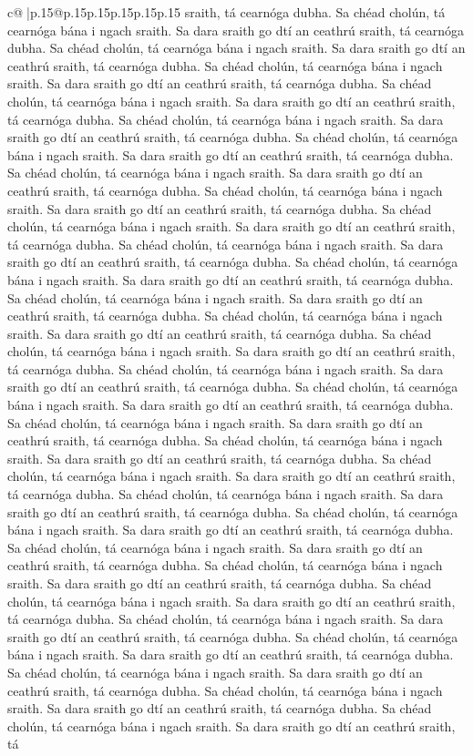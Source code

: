 \documentclass{article}
\begin{document}
{\begin{supertabular}{c@{$\;$}|p{.15\linewidth}@{}p{.15\linewidth}p{.15\linewidth}p{.15\linewidth}p{.15\linewidth}p{.15\linewidth}}
{{{sraith, tá cearnóga dubha. Sa chéad cholún, tá cearnóga bána i ngach sraith. Sa dara sraith go dtí an ceathrú sraith, tá cearnóga dubha. Sa chéad cholún, tá cearnóga bána i ngach sraith. Sa dara sraith go dtí an ceathrú sraith, tá cearnóga dubha. Sa chéad cholún, tá cearnóga bána i ngach sraith. Sa dara sraith go dtí an ceathrú sraith, tá cearnóga dubha. Sa chéad cholún, tá cearnóga bána i ngach sraith. Sa dara sraith go dtí an ceathrú sraith, tá cearnóga dubha. Sa chéad cholún, tá cearnóga bána i ngach sraith. Sa dara sraith go dtí an ceathrú sraith, tá cearnóga dubha. Sa chéad cholún, tá cearnóga bána i ngach sraith. Sa dara sraith go dtí an ceathrú sraith, tá cearnóga dubha. Sa chéad cholún, tá cearnóga bána i ngach sraith. Sa dara sraith go dtí an ceathrú sraith, tá cearnóga dubha. Sa chéad cholún, tá cearnóga bána i ngach sraith. Sa dara sraith go dtí an ceathrú sraith, tá cearnóga dubha. Sa chéad cholún, tá cearnóga bána i ngach sraith. Sa dara sraith go dtí an ceathrú sraith, tá cearnóga dubha. Sa chéad cholún, tá cearnóga bána i ngach sraith. Sa dara sraith go dtí an ceathrú sraith, tá cearnóga dubha. Sa chéad cholún, tá cearnóga bána i ngach sraith. Sa dara sraith go dtí an ceathrú sraith, tá cearnóga dubha. Sa chéad cholún, tá cearnóga bána i ngach sraith. Sa dara sraith go dtí an ceathrú sraith, tá cearnóga dubha. Sa chéad cholún, tá cearnóga bána i ngach sraith. Sa dara sraith go dtí an ceathrú sraith, tá cearnóga dubha. Sa chéad cholún, tá cearnóga bána i ngach sraith. Sa dara sraith go dtí an ceathrú sraith, tá cearnóga dubha. Sa chéad cholún, tá cearnóga bána i ngach sraith. Sa dara sraith go dtí an ceathrú sraith, tá cearnóga dubha. Sa chéad cholún, tá cearnóga bána i ngach sraith. Sa dara sraith go dtí an ceathrú sraith, tá cearnóga dubha. Sa chéad cholún, tá cearnóga bána i ngach sraith. Sa dara sraith go dtí an ceathrú sraith, tá cearnóga dubha. Sa chéad cholún, tá cearnóga bána i ngach sraith. Sa dara sraith go dtí an ceathrú sraith, tá cearnóga dubha. Sa chéad cholún, tá cearnóga bána i ngach sraith. Sa dara sraith go dtí an ceathrú sraith, tá cearnóga dubha. Sa chéad cholún, tá cearnóga bána i ngach sraith. Sa dara sraith go dtí an ceathrú sraith, tá cearnóga dubha. Sa chéad cholún, tá cearnóga bána i ngach sraith. Sa dara sraith go dtí an ceathrú sraith, tá cearnóga dubha. Sa chéad cholún, tá cearnóga bána i ngach sraith. Sa dara sraith go dtí an ceathrú sraith, tá cearnóga dubha. Sa chéad cholún, tá cearnóga bána i ngach sraith. Sa dara sraith go dtí an ceathrú sraith, tá cearnóga dubha. Sa chéad cholún, tá cearnóga bána i ngach sraith. Sa dara sraith go dtí an ceathrú sraith, tá cearnóga dubha. Sa chéad cholún, tá cearnóga bána i ngach sraith. Sa dara sraith go dtí an ceathrú sraith, tá cearnóga dubha. Sa chéad cholún, tá cearnóga bána i ngach sraith. Sa dara sraith go dtí an ceathrú sraith, tá cearnóga dubha. Sa chéad cholún, tá cearnóga bána i ngach sraith. Sa dara sraith go dtí an ceathrú sraith, tá cearnóga dubha. Sa chéad cholún, tá cearnóga bána i ngach sraith. Sa dara sraith go dtí an ceathrú sraith, tá cearnóga dubha. Sa chéad cholún, tá cearnóga bána i ngach sraith. Sa dara sraith go dtí an ceathrú sraith, tá }}}
\end{supertabular}}
\end{document}
